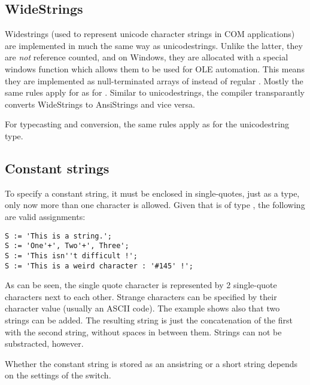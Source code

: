 \subsection{WideStrings}
Widestrings (used to represent unicode character strings in COM applications)
are implemented in much the same way as unicodestrings. Unlike the latter,
they are \emph{not} reference counted, and on Windows, they are allocated with a
special windows function which allows them to be used for OLE automation.
This means they are implemented as null-terminated arrays of  
instead of regular . 
Mostly the same rules apply for  as for . 
Similar to unicodestrings, the compiler transparantly converts WideStrings 
to AnsiStrings and vice versa. 

For typecasting and conversion, the same rules apply as for the
unicodestring type.

\subsection{Constant strings}
To specify a constant string, it must be enclosed in single-quotes, just
as a  type, only now more than one character is allowed.
Given that  is of type , the following are valid assignments:
\begin{verbatim}
S := 'This is a string.';
S := 'One'+', Two'+', Three';
S := 'This isn''t difficult !';
S := 'This is a weird character : '#145' !';
\end{verbatim}
As can be seen, the single quote character is represented by 2 single-quote
characters next to each other. Strange characters can be specified by their
character value (usually an ASCII code).
The example shows also that two strings can be added. The resulting string is
just the concatenation of the first with the second string, without spaces in
between them. Strings can not be substracted, however.

Whether the constant string is stored as an ansistring or a short string
depends on the settings of the  switch.


